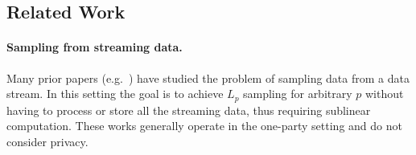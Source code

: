 
\subsection{Related Work}
\paragraph{Sampling from streaming data.}
Many prior papers (e.g.~\cite{cormode2019p,ganguly2007counting,jowhari2011tight,MW10,woodruff2016distributed}) have studied the problem of sampling data from a data stream.  In this setting the goal is to achieve $L_p$ sampling for arbitrary $p$ without having to process or store all the streaming data, thus requiring sublinear computation.  These works generally operate in the one-party setting and do not consider privacy.  




